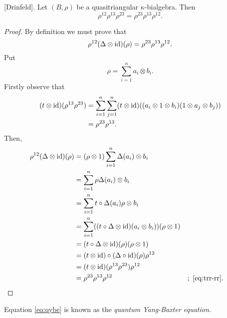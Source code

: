\begin{thm}\label{thm:drinfeld} {\rm[Drinfeld]}.
    Let $(B,\rho)$ be a quasitriangular $\kappa$-bialgebra. Then
    \begin{equation}\label{eq:qybe}
        \rho^{12}\rho^{13}\rho^{23}= \rho^{23}\rho^{13}\rho^{12}.
    \end{equation}
\end{thm}

\begin{proof}
    By definition we must prove that
    $$
        \rho^{12}(\Delta\otimes\text{\rm id})(\rho)
            = \rho^{23}\rho^{13}\rho^{12}.
    $$
    Put
    $$
        \rho = \sum_{i=1}^na_i\otimes b_i.
    $$
    Firstly observe that
    \begin{align}
        (t\otimes\text{\rm id})(\rho^{13}\rho^{23})&= \sum_{i=1}^n\sum_{j=1}^n
                (t\otimes\text{\rm id})
                ((a_i\otimes1\otimes b_i)(1\otimes a_j\otimes b_j))
                \nonumber\\
            &= \rho^{23}\rho^{13}\label{eq:trr-rr}.
    \end{align}
    Then,
    \begin{align*}
        \rho^{12}(\Delta\otimes\text{\rm id})(\rho)
            &= (\rho\otimes1)\sum_{i=1}^n\Delta(a_i)\otimes b_i\\
            &= \sum_{i=1}^n\rho\Delta(a_i)\otimes b_i\\
            &= \sum_{i=1}^nt\circ\Delta(a_i)\rho\otimes b_i\\
            &= \sum_{i=1}^n
                ((t\circ\Delta\otimes\text{\rm id})(a_i\otimes b_i))(\rho\otimes1)\\
            &= (t\circ\Delta\otimes\text{\rm id})(\rho)(\rho\otimes1)\\
            &= (t\otimes\text{\rm id})\circ(\Delta\circ\text{\rm id})(\rho)\rho^{12}\\
            &= (t\otimes\text{\rm id})(\rho^{13}\rho^{23})\rho^{12}\\
            &= \rho^{23}\rho^{13}\rho^{12}
                &&;\ \eqref{eq:trr-rr}.
    \end{align*}
\end{proof}

\begin{rem}
    Equation \eqref{eq:qybe} is known as the \textsl{quantum Yang-Baxter equation}.
\end{rem}

